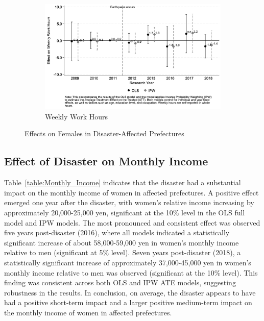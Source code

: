 \documentclass[a4paper,12pt]{article}
\begin{document}
\begin{figure}[htbp]
\begin{center}
    \begin{subfigure}{0.8\linewidth}
        \caption{Weekly Work Hours}
        \label{fig:weekly_work_hours}            
        \centering\includegraphics[width=\linewidth]{weekly_hours_comparison.png}
    \end{subfigure}
    
    \end{center}
    \begin{tablenotes}
        \item{\small{\textit{}}}
    \end{tablenotes}

\caption{Effects on Females in Disaster-Affected Prefectures}
\label{fig:event_study}
    
\end{figure}


\subsection{Effect of Disaster on Monthly Income}

Table~\ref{table:Monthly_Income} indicates that the disaster had a substantial impact on the monthly income of women in affected prefectures. A positive effect emerged one year after the disaster, with women's relative income increasing by approximately 20,000-25,000 yen, significant at the 10\% level in the OLS full model and IPW models. The most pronounced and consistent effect was observed five years post-disaster (2016), where all models indicated a statistically significant increase of about 58,000-59,000 yen in women's monthly income relative to men (significant at 5\% level). Seven years post-disaster (2018), a statistically significant increase of approximately 37,000-45,000 yen in women's monthly income relative to men was observed (significant at the 10\% level). This finding was consistent across both OLS and IPW ATE models, suggesting robustness in the results. In conclusion, on average, the disaster appears to have had a positive short-term impact and a larger positive medium-term impact on the monthly income of women in affected prefectures.
\end{document}
